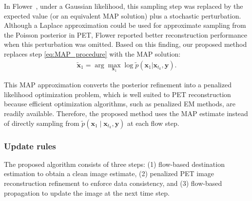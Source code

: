 \documentclass[journal]{IEEEtran}
\begin{document}
In Flower~\cite{pourya2026flower}, under a Gaussian likelihood, this sampling step was replaced by the expected value (or an equivalent MAP solution) plus a stochastic perturbation. Although a Laplace approximation could be used for approximate sampling from the Poisson posterior in PET, Flower reported better reconstruction performance when this perturbation was omitted. Based on this finding, our proposed method replaces step \eqref{eq:MAP_procedure} with the MAP solution:
\begin{align}
  \tilde{\bm x}_1 = \arg\max_{\bm x_1} \log \tilde{p}(\bm x_1 | \bm x_{t_k}, \bm y).
\end{align}

This MAP approximation converts the posterior refinement into a penalized likelihood optimization problem, which is well suited to PET reconstruction because efficient optimization algorithms, such as penalized EM methods, are readily available. Therefore, the proposed method uses the MAP estimate instead of directly sampling from $\tilde{p}(\bm x_1 \mid \bm x_{t_k}, \bm y)$ at each flow step.

\subsubsection{Update rules}
The proposed algorithm consists of three steps: (1) flow-based destination estimation to obtain a clean image estimate, (2) penalized PET image reconstruction refinement to enforce data consistency, and (3) flow-based propagation to update the image at the next time step.
\end{document}
